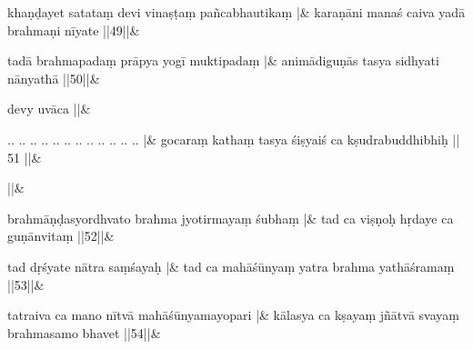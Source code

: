 \documentclass[a4paper,12pt]{article}
\begin{document}
\stanza
{}khaṇḍayet satataṃ devi vinaṣṭaṃ pañcabhautikaṃ |&
karaṇāni manaś caiva yadā brahmaṇi nīyate ||49||\&


\stanza
{}tadā brahmapadaṃ prāpya yogī muktipadaṃ  |&
animādiguṇās tasya  sidhyati nānyathā ||50||\&

\stanza
{}devy uvāca ||\&

\numberlinetrue
{}
\stanza
{} .. .. .. .. .. .. .. .. .. .. .. .. |&
gocaraṃ kathaṃ tasya śiṣyaiś ca kṣudrabuddhibhiḥ || 51 ||\& 


\stanza
{} ||\&

\numberlinetrue
{}
\stanza
{}brahmāṇḍasyordhvato brahma jyotirmayaṃ śubhaṃ |&
tad ca  viṣṇoḥ hṛdaye ca guṇānvitaṃ ||52||\&


\stanza
{}tad  dṛśyate nātra saṃśayaḥ |&
tad ca mahāśūnyaṃ yatra brahma yathāśramaṃ ||53||\&


\stanza
{}tatraiva ca mano nītvā mahāśūnyamayopari |&
kālasya ca kṣayaṃ jñātvā svayaṃ brahmasamo bhavet ||54||\&
\end{document}
